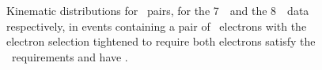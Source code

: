 \begin{figure}[h]
{        }
    \caption[Dilepton invariant mass and transverse momentum in the 7~\tev\
    data. ]
    {Kinematic distributions for
    \dielectron\ pairs, for the 7~\tev\ and the 8~\tev\ data respectively, in events containing a pair of
    \ossf\ electrons with the electron selection tightened to require both
    electrons satisfy the \mediumPP\ requirements and have \ptgt{20}. 
    }
\label{fig:dilep-mass-pt-seven}
\end{figure}

